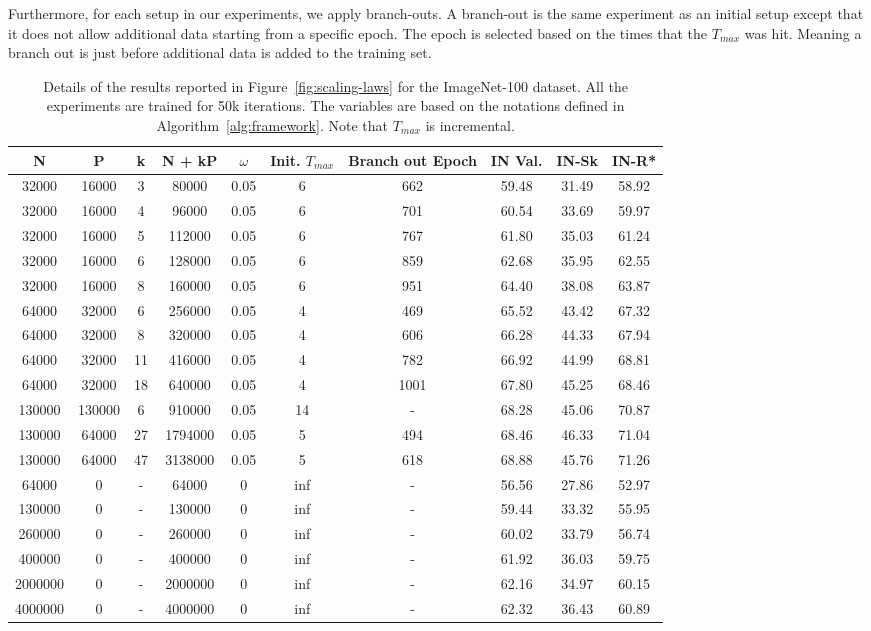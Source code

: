 Furthermore, for each setup in our experiments, we apply branch-outs. A branch-out is the same experiment as an initial setup except that it does not allow additional data starting from a specific epoch. The epoch is selected based on the times that the $T_{max}$ was hit. Meaning a branch out is just before additional data is added to the training set.
\begin{table}[h]
\centering
\begin{tabular}{cccccccccc}
    \toprule
    \textbf{N} & \textbf{P} & \textbf{k} & \textbf{N + kP} & \textbf{$\omega$} & \textbf{Init. $T_{max}$} & \textbf{Branch out Epoch} & \textbf{IN Val.} & \textbf{IN-Sk} & \textbf{IN-R*} \\
    \midrule
    32000 & 16000 & 3& 80000 & 0.05 & 6 & 662 & 59.48 & 31.49 & 58.92 \\
    32000 & 16000 & 4& 96000 & 0.05 & 6 & 701 & 60.54 & 33.69 & 59.97 \\
    32000 & 16000 & 5& 112000 & 0.05 & 6 & 767 & 61.80 & 35.03 & 61.24 \\
    32000 & 16000 & 6& 128000 & 0.05 & 6 & 859 & 62.68 & 35.95 & 62.55 \\
    32000 & 16000 & 8& 160000 & 0.05 & 6 & 951 & 64.40 & 38.08 & 63.87 \\
    64000 & 32000 & 6& 256000 & 0.05 & 4 & 469 & 65.52 & 43.42 & 67.32 \\
    64000 & 32000 & 8& 320000 & 0.05 & 4 & 606 & 66.28 & 44.33 & 67.94 \\
    64000 & 32000 & 11& 416000 & 0.05 & 4 & 782 & 66.92 & 44.99 & 68.81 \\
    64000 & 32000 & 18& 640000 & 0.05 & 4 & 1001 & 67.80 & 45.25 & 68.46 \\
    130000 & 130000 & 6& 910000 & 0.05 & 14 & - & 68.28 & 45.06 & 70.87 \\
    130000 & 64000 & 27& 1794000 & 0.05 & 5 & 494 & 68.46 & 46.33 & 71.04 \\
    130000 & 64000 & 47& 3138000 & 0.05 & 5 & 618 & 68.88 & 45.76 & 71.26 \\
    64000 & 0 & - & 64000 & 0& inf & - & 56.56 & 27.86 & 52.97 \\
    130000 & 0 & - & 130000 & 0& inf & - & 59.44 & 33.32 & 55.95 \\
    260000 & 0 & - & 260000 & 0& inf & - & 60.02 & 33.79 & 56.74 \\
    400000 & 0 & - & 400000 & 0& inf & - & 61.92 & 36.03 & 59.75 \\
    2000000 & 0 & - & 2000000 & 0& inf & - & 62.16 & 34.97 & 60.15 \\
    4000000 & 0 & - & 4000000 & 0& inf & - & 62.32 & 36.43 & 60.89 \\
    \bottomrule
\end{tabular}
\caption{Details of the results reported in Figure~\ref{fig:scaling-laws} for the ImageNet-100 dataset. All the experiments are trained for 50k iterations. The variables are based on the notations defined in Algorithm~\ref{alg:framework}. Note that $T_{max}$ is incremental.}
\label{tab:your_table_label}
\end{table}

